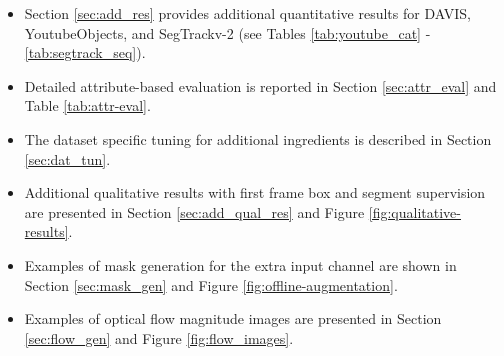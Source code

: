 \documentclass[10pt,twocolumn,letterpaper]{article}
\begin{document}
\begin{itemize}

\item Section \ref{sec:add_res} provides additional quantitative results for DAVIS, YoutubeObjects, and SegTrackv-2 (see Tables \ref{tab:youtube_cat} - \ref{tab:segtrack_seq}).
\item Detailed attribute-based evaluation is reported in Section \ref{sec:attr_eval} and Table \ref{tab:attr-eval}.
\item The dataset specific tuning for additional ingredients is described in Section \ref{sec:dat_tun}.
\item Additional qualitative results with first frame box and segment supervision are presented in Section \ref{sec:add_qual_res} and Figure \ref{fig:qualitative-results}.
\item Examples of mask generation for the extra input channel are shown in Section \ref{sec:mask_gen} and Figure \ref{fig:offline-augmentation}.
\item Examples of optical flow magnitude images are presented in Section \ref{sec:flow_gen} and Figure \ref{fig:flow_images}.




\end{itemize}

\begin{comment}

Ideas for the video:

- What does it take to be at https://www.youtube.com/user/DisneyResearchHub

- Self contained presentation (ready to go to youtube)

- Couple of slides to explain (high level) the method (use figure 1, and wording from paper)

- Couple of examples of our method (alone)

- Couple of examples comparing to other methods

- Couple of examples showing how adding flow further help (flow/no-flow). Show failure cases of MaskTrack where MaskTrack+flow+crf helps.

- More, more examples of MaskTrack+flow+crf versus others

-> Target ~4 minutes video

\end{comment}


\begin{comment}

Releases:

- Full Code ?
- Test time code only ?
- Models (and "demo test time") ?  (note that if test time code is not in full, then 50 models for Davis)
- Result masks for all experiments in table 2 and Mastrack+flow+crf on Davis ?


\end{comment}
\end{document}
